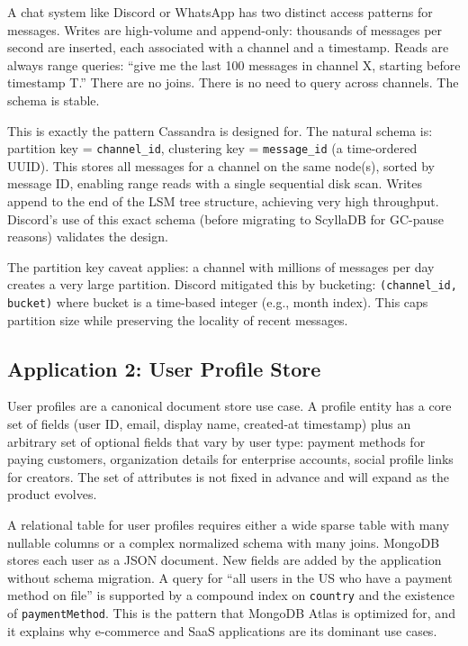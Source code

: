 \documentclass[11pt,a4paper]{article}
\begin{document}
A chat system like Discord or WhatsApp has two distinct access patterns for messages. Writes are high-volume and append-only: thousands of messages per second are inserted, each associated with a channel and a timestamp. Reads are always range queries: ``give me the last 100 messages in channel X, starting before timestamp T.'' There are no joins. There is no need to query across channels. The schema is stable.

This is exactly the pattern Cassandra is designed for. The natural schema is: partition key = \texttt{channel\_id}, clustering key = \texttt{message\_id} (a time-ordered UUID). This stores all messages for a channel on the same node(s), sorted by message ID, enabling range reads with a single sequential disk scan. Writes append to the end of the LSM tree structure, achieving very high throughput. Discord's use of this exact schema (before migrating to ScyllaDB for GC-pause reasons) validates the design.

The partition key caveat applies: a channel with millions of messages per day creates a very large partition. Discord mitigated this by bucketing: \texttt{(channel\_id, bucket)} where bucket is a time-based integer (e.g., month index). This caps partition size while preserving the locality of recent messages.

\subsection{Application 2: User Profile Store}

User profiles are a canonical document store use case. A profile entity has a core set of fields (user ID, email, display name, created-at timestamp) plus an arbitrary set of optional fields that vary by user type: payment methods for paying customers, organization details for enterprise accounts, social profile links for creators. The set of attributes is not fixed in advance and will expand as the product evolves.

A relational table for user profiles requires either a wide sparse table with many nullable columns or a complex normalized schema with many joins. MongoDB stores each user as a JSON document. New fields are added by the application without schema migration. A query for ``all users in the US who have a payment method on file'' is supported by a compound index on \texttt{country} and the existence of \texttt{paymentMethod}. This is the pattern that MongoDB Atlas is optimized for, and it explains why e-commerce and SaaS applications are its dominant use cases.
\end{document}
